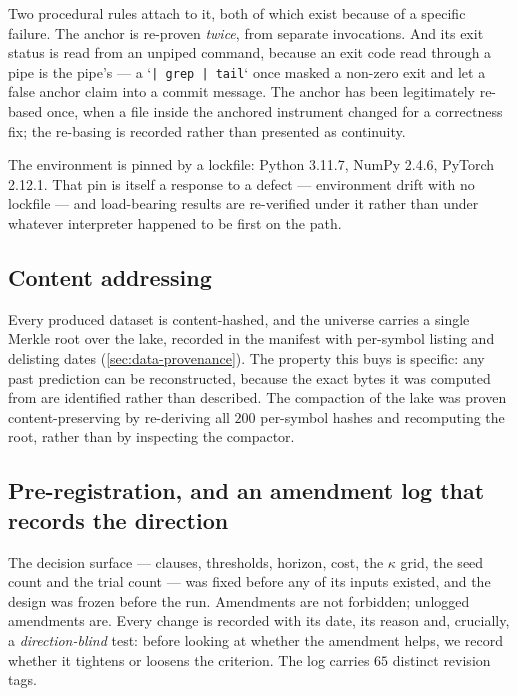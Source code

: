Two procedural rules attach to it, both of which exist because of a specific failure. The anchor is
re-proven \emph{twice}, from separate invocations. And its exit status is read from an unpiped
command, because an exit code read through a pipe is the pipe's --- a `\texttt{| grep | tail}`
once masked a non-zero exit and let a false anchor claim into a commit message. The anchor has been
legitimately re-based once, when a file inside the anchored instrument changed for a correctness
fix; the re-basing is recorded rather than presented as continuity.

The environment is pinned by a lockfile: Python 3.11.7, NumPy 2.4.6, PyTorch 2.12.1. That pin is
itself a response to a defect --- environment drift with no lockfile --- and load-bearing results
are re-verified under it rather than under whatever interpreter happened to be first on the path.

\subsection{Content addressing}
\label{sec:repro-content}

Every produced dataset is content-hashed, and the universe carries a single Merkle root over the
lake, recorded in the manifest with per-symbol listing and delisting dates
(\cref{sec:data-provenance}). The property this buys is specific: any past prediction can be
reconstructed, because the exact bytes it was computed from are identified rather than described.
The compaction of the lake was proven content-preserving by re-deriving all $200$ per-symbol hashes
and recomputing the root, rather than by inspecting the compactor.

\subsection{Pre-registration, and an amendment log that records the direction}
\label{sec:repro-prereg}

The decision surface --- clauses, thresholds, horizon, cost, the $\kappa$ grid, the seed count and
the trial count --- was fixed before any of its inputs existed, and the design was frozen before
the run. Amendments are not forbidden; unlogged amendments are. Every change is recorded with its
date, its reason and, crucially, a \emph{direction-blind} test: before looking at whether the
amendment helps, we record whether it tightens or loosens the criterion. The log carries $65$
distinct revision tags.

